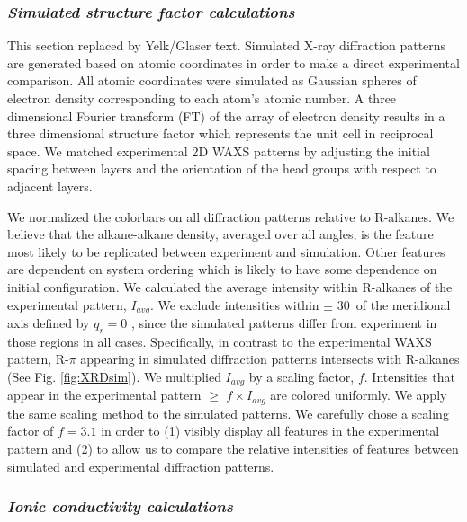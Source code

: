 \documentclass[journal=jpcbfk,manusciprt=article]{achemso}
\begin{document}
  \subsubsection{\textit{Simulated structure factor calculations}}
  {\color{red}This section replaced by Yelk/Glaser text}. 
  Simulated X-ray diffraction patterns are generated based on atomic
  coordinates in order to make a direct experimental comparison. All atomic
  coordinates were simulated as Gaussian spheres of electron density
  corresponding to each atom's atomic number. A three dimensional Fourier
  transform (FT) of the array of electron density results in a three dimensional
  structure factor which represents the unit cell in reciprocal space. We matched
  experimental 2D WAXS patterns by adjusting the initial spacing between layers
  and the orientation of the head groups with respect to adjacent layers.

  We normalized the colorbars on all diffraction patterns relative to
  R-alkanes. We believe that the alkane-alkane density, averaged over all angles,
  is the feature most likely to be replicated between experiment and simulation.
  Other features are dependent on system ordering which is likely to have some
  dependence on initial configuration. We calculated the average intensity within
  R-alkanes of the experimental pattern, $I_{avg}$. We exclude intensities within
  $\pm$ 30\degree~of the meridional axis defined by $q_r=0$ , since the simulated
  patterns differ from experiment in those regions in all cases. Specifically, in
  contrast to the experimental WAXS pattern, R-$\pi$ appearing in simulated
  diffraction patterns intersects with R-alkanes (See Fig. \ref{fig:XRDsim}). We
  multiplied $I_{avg}$ by a scaling factor, $f$. Intensities that appear in the
  experimental pattern $\geq$ $f\times I_{avg}$ are colored uniformly. We apply
  the same scaling method to the simulated patterns. We carefully chose a scaling
  factor of $f=3.1$ in order to (1) visibly display all features in the
  experimental pattern and (2) to allow us to compare the relative intensities of
  features between simulated and experimental diffraction patterns.

  \subsubsection{\textit{Ionic conductivity calculations}}
\end{document}
